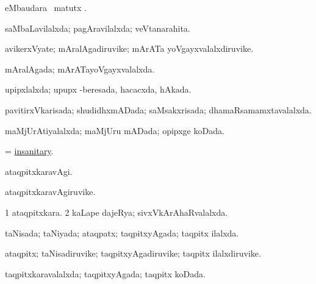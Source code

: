 \bentry
{} 
\gl{\sakirx}
\expl{}
\bmng
{} eMbaudara \BU\ matutx \BUkaq. 
\emng
\eentry

\bentry
{} 
\gl{\gu}
\expl{}
\bmng
saMbaLavilalxda; pagAravilalxda; veVtanarahita. 
\emng
\eentry

\bentry
{} 
\gl{\nA}
\expl{}
\bmng
avikerxVyate; mAralAgadiruvike; mArATa yoVgayxvalalxdiruvike. 
\emng
\eentry

\bentry
{} 
\gl{\gu}
\expl{}
\bmng
mAralAgada; mArATayoVgayxvalalxda. 
\emng
\eentry

\bentry
{} 
\gl{\gu}
\expl{}
\bmng
upipxlalxda; upupx -beresada, hacacxda, hAkada. 
\emng
\eentry

\bentry
{} 
\gl{\gu}
\expl{}
\bmng
pavitirxVkarisada; shudidhxmADada; saMsakxrisada; dhamaRsamamxtavalalxda. 
\emng
\eentry

\bentry
{} 
\gl{\gu}
\expl{}
\bmng
maMjUrAtiyalalxda; maMjUru mADada; opipxge koDada. 
\emng
\eentry

\bentry
{} 
\gl{\gu}
\expl{}
\bmng
= \hyperref{kandict_i.pdf}{I}{insanitary}{insanitary}. 
\emng
\eentry

\bentry
{} 
\gl{\kirxvi}
\expl{}
\bmng
ataqpitxkaravAgi. 
\emng
\eentry

\bentry
{} 
\gl{\nA}
\expl{}
\bmng
ataqpitxkaravAgiruvike. 
\emng
\eentry

\bentry
{} 
\gl{\gu}
\expl{}
\bmng
\bnum
\num{1} ataqpitxkara. 
\num{2} kaLape dajeRya; sivxVkArAhaRvalalxda. 
\enum
\emng
\eentry

\bentry
{} 
\gl{\gu}
\expl{}
\bmng
taNisada; taNiyada; ataqpatx; taqpitxyAgada; taqpitx ilalxda. 
\emng
\eentry

\bentry
{} 
\gl{\nA}
\expl{}
\bmng
ataqpitx; taNisadiruvike; taqpitxyAgadiruvike; taqpitx ilalxdiruvike. 
\emng
\eentry

\bentry
{} 
\gl{\gu}
\expl{}
\bmng
taqpitxkaravalalxda; taqpitxyAgada; taqpitx koDada. 
\emng
\eentry

